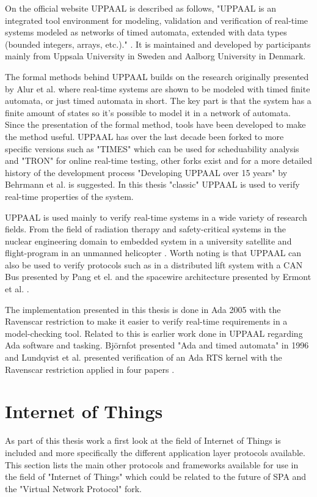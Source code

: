 On the official website UPPAAL is described as follows, "UPPAAL is an
integrated tool environment for modeling, validation and verification of
real-time systems modeled as networks of timed automata, extended with data
types (bounded integers, arrays, etc.)." \cite{web:uppaal}. It is maintained
and developed by participants mainly from Uppsala University in Sweden and
Aalborg University in Denmark.

The formal methods behind UPPAAL builds on the research originally presented
by Alur et al. \cite{alur1994} where real-time systems are shown to be modeled
with timed finite automata, or just timed automata in short. The key part is
that the system has a finite amount of states so it's possible to model it in a
network of automata. Since the presentation of the formal method, tools have
been developed to make the method useful. UPPAAL has over the last decade been
forked to more specific versions such as "TIMES" which can be used for
scheduability analysis and "TRON" for online real-time testing, other forks
exist and for a more detailed history of the development process "Developing
UPPAAL over 15 years" by Behrmann et al.  \cite{behrmann2011} is suggested. In
this thesis "classic" UPPAAL is used to verify real-time properties of the
system.

UPPAAL is used mainly to verify real-time systems in a wide variety of research
fields. From the field of radiation therapy \cite{man2011} and safety-critical
systems in the nuclear engineering domain \cite{lahtinen2012} to embedded
system in a university satellite \cite{alencar2013} and flight-program in an
unmanned helicopter \cite{lee2011}. Worth noting is that UPPAAL can also be used
to verify protocols such as in a distributed lift system with a CAN Bus
presented by Pang et el. \cite{pang2003} and the spacewire architecture
presented by Ermont et al. \cite{ermont2013}.

The implementation presented in this thesis is done in Ada 2005 with the
Ravenscar restriction to make it easier to verify real-time requirements in a
model-checking tool. Related to this is earlier work done in UPPAAL regarding
Ada software and tasking. Bj\"{o}rnfot presented "Ada and timed automata" in
1996 \cite{bjornfot1996} and Lundqvist et al. presented verification of an Ada
RTS kernel with the Ravenscar restriction applied in four papers
\cite{lundqvist1999f,lundqvist1999g,lundqvist1999h,lundqvist2003}.

\section{Internet of Things} \label{sec:sota:internet_of_things}
As part of this thesis work a first look at the field of Internet of Things is
included and more specifically the different application layer protocols
available. This section lists the main other protocols and frameworks available
for use in the field of "Internet of Things" which could be related to the
future of SPA and the "Virtual Network Protocol" fork.

